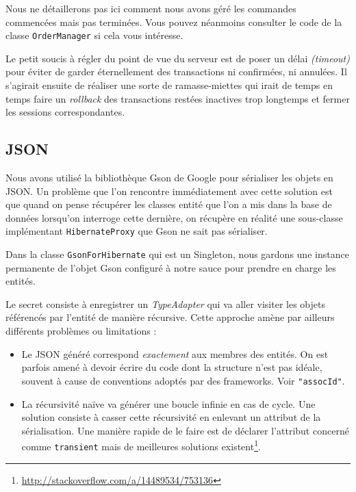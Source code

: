 Nous ne détaillerons pas ici comment nous avons géré les commandes commencées mais pas terminées. Vous pouvez néanmoins
consulter le code de la classe \verb|OrderManager| si cela vous intéresse.

Le petit soucis à régler du point de vue du serveur est de poser un délai \emph{(timeout)} pour éviter
de garder éternellement des transactions ni confirmées, ni annulées. Il s'agirait ensuite
de réaliser une sorte de ramasse-miettes qui irait de temps en temps faire un \emph{rollback} des transactions
restées inactives trop longtemps et fermer les sessions correspondantes.

\subsection{JSON}

Nous avons utilisé la bibliothèque Gson de Google pour sérialiser les objets en JSON. Un problème que l'on rencontre
immédiatement avec cette solution est que quand on pense récupérer les classes entité que l'on a mis dans la base
de données lorsqu'on interroge cette dernière, on récupère en réalité une sous-classe implémentant 
\verb|HibernateProxy| que Gson ne sait pas sérialiser.

Dans la classe \verb|GsonForHibernate| qui est un Singleton, nous gardons une instance permanente
de l'objet Gson configuré à notre sauce pour prendre en charge les entités.

Le secret consiste à enregistrer un \emph{TypeAdapter} qui va aller visiter les objets
référencés par l'entité de manière récursive. Cette approche amène par ailleurs différents problèmes ou limitations :

\begin{itemize}
    \item Le JSON généré correspond \emph{exactement} aux membres des entités. On est parfois
          amené à devoir écrire du code dont la structure n'est pas idéale, souvent à cause de conventions
          adoptés par des frameworks. Voir \verb|"assocId"|.
    \item La récursivité naïve va générer une boucle infinie en cas de cycle. Une solution
          consiste à casser cette récursivité en enlevant un attribut de la sérialisation. Une manière
          rapide de le faire est de déclarer l'attribut concerné comme \verb|transient| mais de meilleures
          solutions existent\footnote{\url{http://stackoverflow.com/a/14489534/753136}}.
\end{itemize}
